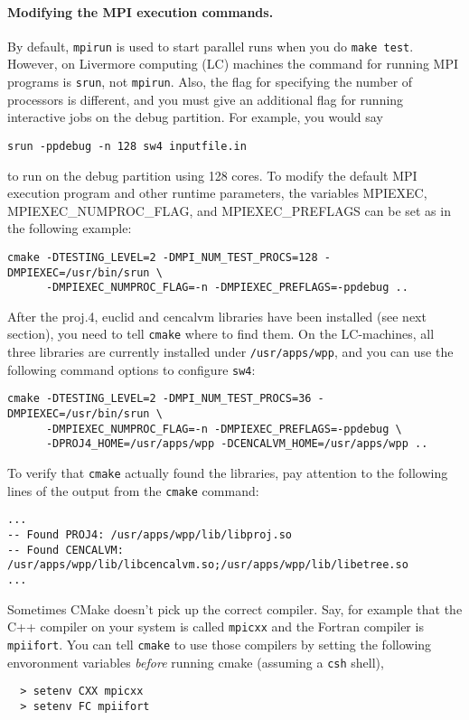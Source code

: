 \documentclass[11pt]{article}
\begin{document}
\paragraph{Modifying the MPI execution commands.}
By default, \verb+mpirun+ is used to start parallel runs when you do \verb+make test+.  However, on
Livermore computing (LC) machines the command for running MPI programs is \verb+srun+, not
\verb+mpirun+. Also, the flag for specifying the number of processors is different, and you must
give an additional flag for running interactive jobs on the debug partition. For example, you would
say
\begin{verbatim}
srun -ppdebug -n 128 sw4 inputfile.in
\end{verbatim}
to run on the debug partition using 128 cores. To modify the default MPI execution program and
other runtime parameters, the variables MPIEXEC, MPIEXEC\_NUMPROC\_FLAG, and
MPIEXEC\_PREFLAGS can be set as in the following example:
\begin{verbatim}
cmake -DTESTING_LEVEL=2 -DMPI_NUM_TEST_PROCS=128 -DMPIEXEC=/usr/bin/srun \
      -DMPIEXEC_NUMPROC_FLAG=-n -DMPIEXEC_PREFLAGS=-ppdebug ..
\end{verbatim}

After the proj.4, euclid and cencalvm libraries have been installed (see next section), you need to tell
\verb+cmake+ where to find them. On the LC-machines, all three libraries are currently installed under
\verb+/usr/apps/wpp+, and you can use the following command options to configure \verb+sw4+:
\begin{verbatim}
cmake -DTESTING_LEVEL=2 -DMPI_NUM_TEST_PROCS=36 -DMPIEXEC=/usr/bin/srun \
      -DMPIEXEC_NUMPROC_FLAG=-n -DMPIEXEC_PREFLAGS=-ppdebug \
      -DPROJ4_HOME=/usr/apps/wpp -DCENCALVM_HOME=/usr/apps/wpp ..
\end{verbatim}
To verify that \verb+cmake+ actually found the libraries, pay attention to the
following lines of the output from the \verb+cmake+ command:
\begin{verbatim}
...
-- Found PROJ4: /usr/apps/wpp/lib/libproj.so  
-- Found CENCALVM: /usr/apps/wpp/lib/libcencalvm.so;/usr/apps/wpp/lib/libetree.so  
...
\end{verbatim}

Sometimes CMake doesn't pick up the correct compiler. Say, for example that the C++ compiler on your
system is called {\tt mpicxx} and the Fortran compiler is {\tt mpiifort}. You can tell {\tt cmake}
to use those compilers by setting the following envoronment variables {\em before} running cmake
(assuming a {\tt csh} shell),
\begin{verbatim}
  > setenv CXX mpicxx
  > setenv FC mpiifort
\end{verbatim}
\end{document}
